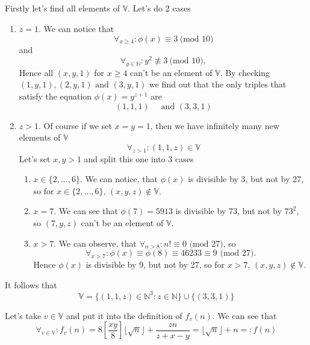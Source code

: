 \documentclass[12pt]{article}
\begin{document}
\begin{flushleft}
\subsection*{}
Firstly let's find all elements of $\mathbb{V}$. Let's do 2 cases
\begin{enumerate}[label=\arabic*.]
    \item  $z=1$. We can notice that 
    \[\forall_{x\geq4}:\phi(x)\equiv 3\ \text{(mod }10)\]
    and 
    \[\forall_{y\in\mathbb{N}}:y^2\not\equiv3\ \text{(mod }10),\]
    Hence all $(x,y,1)$ for $x\geq 4$ can't be an element of $\mathbb{V}$. By checking $(1,y,1),(2,y,1)\text{ and }(3,y,1)$ we find out that the only triples that satisfy the equation $\phi(x)=y^{z+1}$ are 
    \[(1,1,1)\quad \text{ and }(3,3,1)\]
    \item $z>1$. Of course if we set $x=y=1$, then we have infinitely many new elements of $\mathbb{V}$
    \[\forall_{z>1}:(1,1,z)\in\mathbb{V}\]
    Let's set $x,y>1$ and split this one into 3 cases\begin{enumerate}[label=\textbullet]
        \item $x\in\{2,...,6\}$. We can notice, that $\phi(x)$ is divisible by 3, but not by 27, so for $x\in\{2,...,6\}$, $(x,y,z)\notin\mathbb{V}$. 
        \item $x=7$. We can see that $\phi(7)=5913$ is divisible by 73, but not by $73^2$, so $(7,y,z)$ can't be an element of $\mathbb{V}$.
        \item $x>7$. We can observe, that $\forall_{n>8}:n!\equiv0\text{ (mod }27)$, so 
        \[\forall_{x>7}:\phi(x)\equiv\phi(8)\equiv46233\equiv9\text{ (mod }27).\]
        Hence $\phi(x)$ is divisible by 9, but not by 27, so for $x>7$, $(x,y,z)\notin\mathbb{V}$.
    \end{enumerate}
\end{enumerate}
It follows that 
\[\mathbb{V}=\{(1,1,z)\in\mathbb{N}^3:z\in\mathbb{N}\}\cup\{(3,3,1)\}\]

Let's take $v\in\mathbb{V}$ and put it into the definition of $f_v(n)$. We can see that 
\[\forall_{v\in\mathbb{V}}:f_v(n)=8\left[\frac{xy}{8}\right]\lfloor\sqrt{n}\rfloor+\frac{zn}{z+x-y}=\lfloor\sqrt{n}\rfloor+n=:f(n)\]


\end{flushleft}
\end{document}

